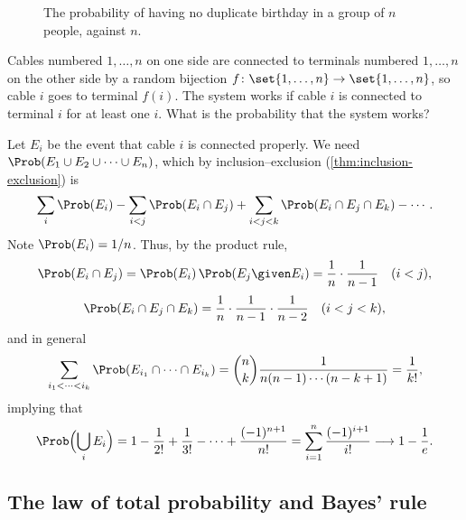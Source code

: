 \begin{figure}[ht]
\centering
{}
\caption{The probability of having no duplicate birthday in a group of $n$ people, against $n$.}
\label{fig:birthday}
\end{figure}

\begin{example}\label{ex:cable-matching}
Cables numbered $1, \ldots, n$ on one side are connected to terminals numbered $1, \ldots, n$ on the other side by a random bijection $f \colon \set{1, \ldots, n} \to \set{1, \ldots, n}$, so cable $i$ goes to terminal $f(i)$. The system works if cable $i$ is connected to terminal $i$ for at least one $i$. What is the probability that the system works?
\end{example}

\begin{solution}
Let $E_i$ be the event that cable $i$ is connected properly. We need $\Prob(E_1 \cup E_2 \cup \cdots \cup E_n)$, which by inclusion--exclusion (\cref{thm:inclusion-exclusion}) is
\[
  \sum_i \Prob(E_i) - \sum_{i<j} \Prob(E_i \cap E_j) + \sum_{i<j<k} \Prob(E_i \cap E_j \cap E_k) - \cdots.
\]
Note $\Prob(E_i) = 1/n$. Thus, by the product rule,
\[
  \Prob(E_i \cap E_j) = \Prob(E_i)\,\Prob(E_j \given E_i) = \frac1n \cdot \frac{1}{n-1} \quad (i < j),
\]
\[
  \Prob(E_i \cap E_j \cap E_k) = \frac1n \cdot \frac{1}{n-1} \cdot \frac{1}{n-2} \quad (i < j < k),
\]
and in general
\[
  \sum_{i_1 < \cdots < i_k} \Prob(E_{i_1} \cap \cdots \cap E_{i_k}) = \binom{n}{k} \frac{1}{n(n-1)\cdots(n-k+1)} = \frac{1}{k!},
\]
implying that
\[
  \Prob\Bigl(\bigcup_i E_i\Bigr) = 1 - \frac{1}{2!} + \frac{1}{3!} - \cdots + \frac{(-1)^{n+1}}{n!} = \sum_{i=1}^n \frac{(-1)^{i+1}}{i!} \longrightarrow 1 - \frac1e.
\]
\end{solution}

\subsection{The law of total probability and Bayes' rule}\label{sec:total-probability-bayes}

